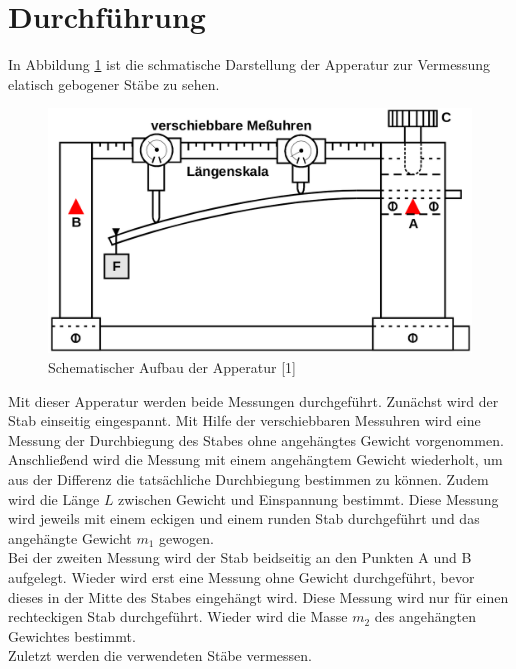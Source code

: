 \section{Durchführung}
\label{sec:Durchführung}

In Abbildung \ref{fig:abb2} ist die schmatische Darstellung der Apperatur zur 
Vermessung elatisch gebogener Stäbe zu sehen. 

\begin{figure}
    \centering
    \includegraphics[scale=0.2]{content/aufbau.png}
    \caption{Schematischer Aufbau der Apperatur [1]}
    \label{fig:abb2}
\end{figure}

Mit dieser Apperatur werden beide Messungen durchgeführt. Zunächst wird
der Stab einseitig eingespannt. Mit Hilfe der verschiebbaren Messuhren 
wird eine Messung der Durchbiegung des Stabes ohne angehängtes Gewicht 
vorgenommen. Anschließend wird die Messung mit einem angehängtem 
Gewicht wiederholt, um aus der Differenz die tatsächliche Durchbiegung
bestimmen zu können. Zudem wird die Länge $L$ zwischen Gewicht und 
Einspannung bestimmt. Diese Messung wird jeweils mit einem eckigen und 
einem runden Stab durchgeführt und das angehängte Gewicht $m_1$ gewogen.
\\
Bei der zweiten Messung wird der Stab beidseitig an den Punkten A und B 
aufgelegt. Wieder wird erst eine Messung ohne Gewicht durchgeführt, 
bevor dieses in der Mitte des Stabes eingehängt wird. Diese 
Messung wird nur für einen rechteckigen Stab durchgeführt. Wieder 
wird die Masse $m_2$ des angehängten Gewichtes bestimmt. 
\\
Zuletzt werden die verwendeten Stäbe vermessen. 
